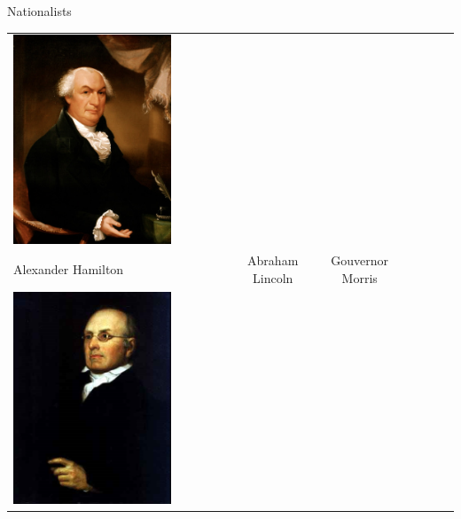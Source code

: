 \begin{frame}{Nationalists}
\begin{table}[h]
\begin{tabular}{lcccccc}
    \includegraphics[width=0.75\textwidth,height=.3\textheight,keepaspectratio=true]{img/morris-portrait.png} \\
    Alexander Hamilton & 
    Abraham Lincoln &
    Gouvernor Morris \\
    \includegraphics[width=0.75\textwidth,height=.3\textheight,keepaspectratio=true]{img/story-portrait.png} &

\end{tabular}
\end{table}
\end{frame}
